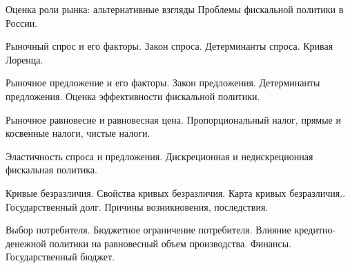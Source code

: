\documentclass[
	14pt,
	a4paper,
	]
	{scrartcl}
\begin{document}
\vfill

\newpage


\shapk
{}
\setcounter{zad}{0}

\vfill
\z 	Оценка роли рынка: альтернативные взгляды
 \vfill
\z 	Проблемы фискальной политики в России.
 \vfill

\vfill

\newpage


\shapk
{}
\setcounter{zad}{0}

\vfill
\z 	Рыночный спрос и его факторы.  Закон спроса. Детерминанты спроса.
 \vfill
\z 	Кривая Лоренца.
 \vfill

\vfill

\newpage


\shapk
{}
\setcounter{zad}{0}

\vfill
\z 	Рыночное предложение и его факторы.  Закон предложения. Детерминанты предложения.
 \vfill
\z 	Оценка эффективности фискальной политики.
 \vfill

\vfill

\newpage


\shapk
{}
\setcounter{zad}{0}

\vfill
\z 	Рыночное равновесие и равновесная цена.
 \vfill
\z 	Пропорциональный налог, прямые и косвенные налоги, чистые налоги.
 \vfill

\vfill

\newpage


\shapk
{}
\setcounter{zad}{0}

\vfill
\z 	Эластичность спроса и предложения.
 \vfill
\z 	Дискреционная и недискреционная фискальная политика.
 \vfill

\vfill

\newpage


\shapk
{}
\setcounter{zad}{0}

\vfill
\z 	Кривые безразличия. Свойства кривых безразличия. Карта кривых безразличия..
 \vfill
\z 	Государственный долг. Причины возникновения, последствия.
 \vfill

\vfill

\newpage


\shapk
{}
\setcounter{zad}{0}

\vfill
\z 	Выбор потребителя. Бюджетное ограничение потребителя.
 \vfill
\z 	Влияние кредитно-денежной политики на равновесный объем производства.	Финансы. Государственный бюджет.
 \vfill
\end{document}
